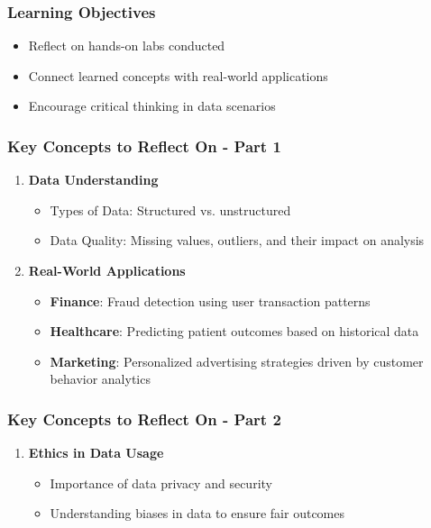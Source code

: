 \documentclass[aspectratio=169]{beamer}
\begin{document}
\begin{frame}[fragile]
    \frametitle{Learning Objectives}
    \begin{itemize}
        \item Reflect on hands-on labs conducted
        \item Connect learned concepts with real-world applications
        \item Encourage critical thinking in data scenarios
    \end{itemize}
\end{frame}

\begin{frame}[fragile]
    \frametitle{Key Concepts to Reflect On - Part 1}
    \begin{enumerate}
        \item \textbf{Data Understanding} 
            \begin{itemize}
                \item Types of Data: Structured vs. unstructured
                \item Data Quality: Missing values, outliers, and their impact on analysis
            \end{itemize}
        
        \item \textbf{Real-World Applications} 
            \begin{itemize}
                \item \textbf{Finance}: Fraud detection using user transaction patterns
                \item \textbf{Healthcare}: Predicting patient outcomes based on historical data
                \item \textbf{Marketing}: Personalized advertising strategies driven by customer behavior analytics
            \end{itemize}
    \end{enumerate}
\end{frame}

\begin{frame}[fragile]
    \frametitle{Key Concepts to Reflect On - Part 2}
    \begin{enumerate}[resume]
        \item \textbf{Ethics in Data Usage} 
            \begin{itemize}
                \item Importance of data privacy and security
                \item Understanding biases in data to ensure fair outcomes
            \end{itemize}
    \end{enumerate}
\end{frame}
\end{document}
